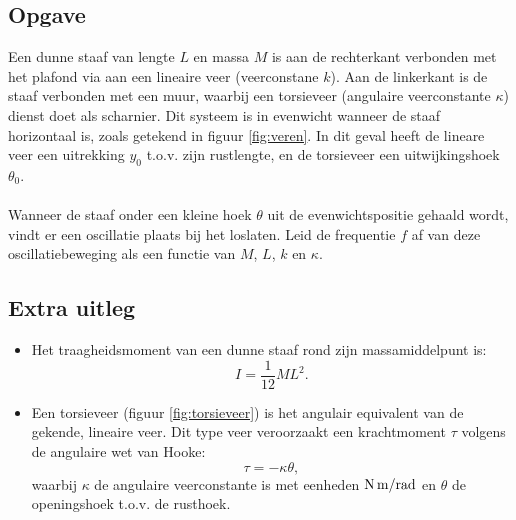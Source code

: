 \documentclass[a4paper,11pt]{article}
\begin{document}
\subsection*{Opgave}
Een dunne staaf van lengte $L$ en massa $M$ is aan de rechterkant verbonden met het plafond via aan een lineaire veer (veerconstane $k$). Aan de linkerkant is de staaf verbonden met een muur, waarbij een torsieveer (angulaire veerconstante $\kappa$) dienst doet als scharnier. Dit systeem is in evenwicht wanneer de staaf horizontaal is, zoals getekend in figuur \ref{fig:veren}. In dit geval heeft de lineare veer een uitrekking $y_0$ t.o.v. zijn rustlengte, en de torsieveer een uitwijkingshoek $\theta_0$. 
\\ \\
Wanneer de staaf onder een kleine hoek $\theta$ uit de evenwichtspositie gehaald wordt, vindt er een oscillatie plaats bij het loslaten. Leid de frequentie $f$ af van deze oscillatiebeweging als een functie van $M$, $L$, $k$ en $\kappa$.

\subsection*{Extra uitleg}
\begin{itemize}
    \item Het traagheidsmoment van een dunne staaf rond zijn massamiddelpunt is:
\begin{equation}
    I=\frac{1}{12}ML^2.
\end{equation}
    \item  Een torsieveer (figuur \ref{fig:torsieveer}) is het angulair equivalent van de gekende, lineaire veer. Dit type veer veroorzaakt een krachtmoment $\tau$ volgens de angulaire wet van Hooke:
    \begin{equation}
       \tau = -\kappa \theta,
    \end{equation}
    waarbij $\kappa$ de angulaire veerconstante is met eenheden ${\rm N\, m/rad }$ en $\theta$ de openingshoek t.o.v. de rusthoek.
    \end{itemize}
\end{document}
